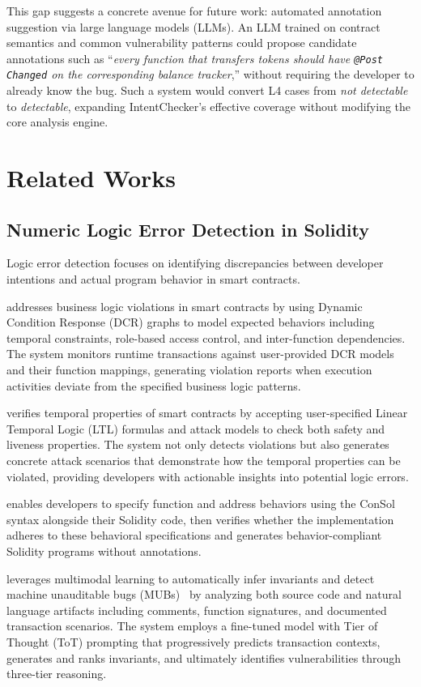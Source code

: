 \documentclass[pdflatex,sn-basic]{sn-jnl}%
\theoremstyle{thmstyleone}%
\theoremstyle{thmstyletwo}%
\theoremstyle{thmstylethree}%
\begin{document}
This gap suggests a concrete avenue for future work:
automated annotation suggestion via large language models (LLMs).
An LLM trained on contract semantics and common vulnerability patterns
could propose candidate annotations such as
``\emph{every function that transfers tokens should have \texttt{@Post Changed} on the corresponding balance tracker},''
without requiring the developer to already know the bug.
Such a system would convert L4 cases from \emph{not detectable} to \emph{detectable},
expanding IntentChecker's effective coverage
without modifying the core analysis engine.

\section{Related Works}\label{sec:related}
\subsection{Numeric Logic Error Detection in Solidity}
Logic error detection focuses on identifying discrepancies between developer intentions and actual program behavior in smart contracts.

\citep{highguard} addresses business logic violations in smart contracts by using Dynamic Condition Response (DCR) graphs
to model expected behaviors including temporal constraints, role-based access control, and inter-function dependencies.
The system monitors runtime transactions against user-provided DCR models and their function mappings,
generating violation reports when execution activities deviate from the specified business logic patterns.

\citep{smartpulse} verifies temporal properties of smart contracts by accepting user-specified Linear Temporal Logic (LTL) formulas
and attack models to check both safety and liveness properties.
The system not only detects violations but also generates concrete attack scenarios that demonstrate how the temporal properties can be violated,
providing developers with actionable insights into potential logic errors.

\citep{consolidating} enables developers to specify function and address behaviors using the ConSol syntax alongside their Solidity code,
then verifies whether the implementation adheres to these behavioral specifications and generates behavior-compliant Solidity programs without annotations.

\citep{smartinv} leverages multimodal learning to automatically infer invariants and detect machine unauditable bugs (MUBs)~\citep{exploitablebugs}
by analyzing both source code and natural language artifacts including comments, function signatures, and documented transaction scenarios.
The system employs a fine-tuned model with Tier of Thought (ToT) prompting that progressively predicts transaction contexts,
generates and ranks invariants, and ultimately identifies vulnerabilities through three-tier reasoning.
\end{document}
